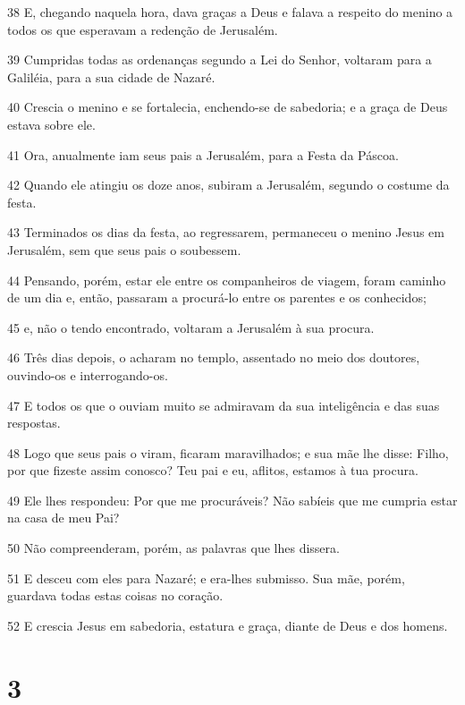 \par 38 E, chegando naquela hora, dava graças a Deus e falava a respeito do menino a todos os que esperavam a redenção de Jerusalém.
\par 39 Cumpridas todas as ordenanças segundo a Lei do Senhor, voltaram para a Galiléia, para a sua cidade de Nazaré.
\par 40 Crescia o menino e se fortalecia, enchendo-se de sabedoria; e a graça de Deus estava sobre ele.
\par 41 Ora, anualmente iam seus pais a Jerusalém, para a Festa da Páscoa.
\par 42 Quando ele atingiu os doze anos, subiram a Jerusalém, segundo o costume da festa.
\par 43 Terminados os dias da festa, ao regressarem, permaneceu o menino Jesus em Jerusalém, sem que seus pais o soubessem.
\par 44 Pensando, porém, estar ele entre os companheiros de viagem, foram caminho de um dia e, então, passaram a procurá-lo entre os parentes e os conhecidos;
\par 45 e, não o tendo encontrado, voltaram a Jerusalém à sua procura.
\par 46 Três dias depois, o acharam no templo, assentado no meio dos doutores, ouvindo-os e interrogando-os.
\par 47 E todos os que o ouviam muito se admiravam da sua inteligência e das suas respostas.
\par 48 Logo que seus pais o viram, ficaram maravilhados; e sua mãe lhe disse: Filho, por que fizeste assim conosco? Teu pai e eu, aflitos, estamos à tua procura.
\par 49 Ele lhes respondeu: Por que me procuráveis? Não sabíeis que me cumpria estar na casa de meu Pai?
\par 50 Não compreenderam, porém, as palavras que lhes dissera.
\par 51 E desceu com eles para Nazaré; e era-lhes submisso. Sua mãe, porém, guardava todas estas coisas no coração.
\par 52 E crescia Jesus em sabedoria, estatura e graça, diante de Deus e dos homens.

\chapter{3}

